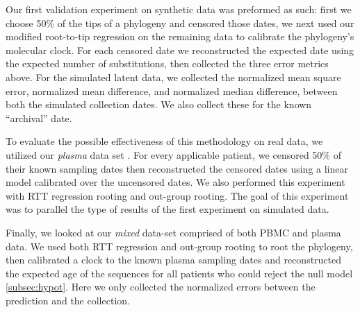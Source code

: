 Our first validation experiment on synthetic data was preformed as such: first we choose 50\% of the tips of a phylogeny and censored those dates, we next used our  modified root-to-tip regression \citep{APE} on the remaining data to calibrate the phylogeny's molecular clock. 
For each censored date we reconstructed the expected date using the expected number of substitutions, then collected the three error metrics above.
For the simulated latent data, we collected the normalized mean square error, normalized mean difference, and normalized median difference, between both the simulated collection dates. We also collect these for the known ``archival'' date.

To evaluate the possible effectiveness of this methodology on real data, we utilized our {\em plasma} data set \citep{McCloskey14}. 
For every applicable patient, we censored 50\% of their known sampling dates then reconstructed the censored dates using a linear model calibrated over the uncensored dates. 
We also performed this experiment with RTT regression rooting and out-group rooting. The goal of this experiment was to parallel the type of results of the first experiment on simulated data. 

Finally, we looked at our {\em mixed} data-set comprised of both PBMC and plasma data. 
We used both RTT regression and out-group rooting to root the phylogeny, then calibrated a clock to the known plasma sampling dates and reconstructed the expected age of the sequences for all patients who could reject the null model \ref{subsec:hypot}. 
Here we only collected the normalized errors between the prediction and the collection.


